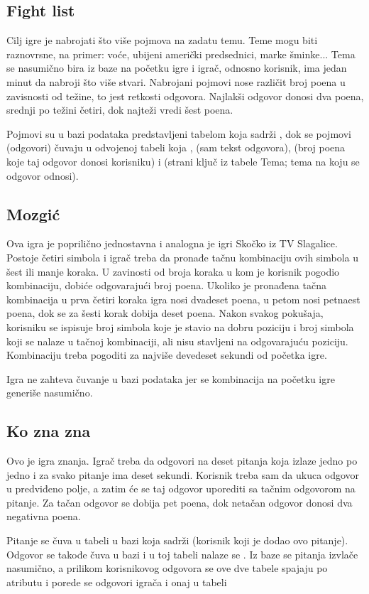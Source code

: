 \documentclass{article}
\begin{document}
\subsection{Fight list}
Cilj igre je nabrojati što više pojmova na zadatu temu. Teme mogu biti raznovrsne, na 
primer: voće, ubijeni američki predsednici, marke šminke... Tema se nasumično bira iz baze na 
početku igre i igrač, odnosno korisnik, ima jedan minut da nabroji što više stvari. Nabrojani 
pojmovi nose različit broj poena u zavisnosti od težine, to jest retkosti odgovora. Najlakši 
odgovor donosi dva poena, srednji po težini četiri, dok najteži vredi šest poena.
\par Pojmovi su u bazi podataka predstavljeni tabelom koja sadrži , dok se 
pojmovi (odgovori) čuvaju u odvojenoj tabeli koja ,  (sam tekst odgovora), 
(broj poena koje taj odgovor donosi korisniku) i  (strani ključ iz tabele Tema; tema 
na koju se odgovor odnosi).
\subsection{Mozgić}
Ova igra je poprilično jednostavna i analogna je igri Skočko iz TV Slagalice. Postoje četiri 
simbola i igrač treba da pronađe tačnu kombinaciju ovih simbola u šest ili manje koraka. U 
zavinosti od broja koraka u kom je korisnik pogodio kombinaciju, dobiće odgovarajući broj 
poena. Ukoliko je pronađena tačna kombinacija u prva četiri koraka igra nosi dvadeset poena, u 
petom nosi petnaest poena, dok se za šesti korak dobija deset poena. Nakon svakog pokušaja, 
korisniku se ispisuje broj simbola koje je stavio na dobru poziciju i broj simbola koji se nalaze u 
tačnoj kombinaciji, ali nisu stavljeni na odgovarajuću poziciju. Kombinaciju treba pogoditi za 
najviše devedeset sekundi od početka igre.
\par Igra ne zahteva čuvanje u bazi podataka jer se kombinacija na početku igre generiše 
nasumično.
\newpage
\subsection{Ko zna zna}
Ovo je igra znanja. Igrač treba da odgovori na deset pitanja koja izlaze jedno po jedno i 
za svako pitanje ima deset sekundi. Korisnik treba sam da ukuca odgovor u predviđeno polje, a 
zatim će se taj odgovor uporediti sa tačnim odgovorom na pitanje. Za tačan odgovor se dobija 
pet poena, dok netačan odgovor donosi dva negativna poena.
\par Pitanje se čuva u tabeli u bazi koja sadrži  (korisnik koji je 
dodao ovo pitanje). Odgovor se takođe čuva u bazi i u toj tabeli nalaze se . Iz baze se pitanja izvlače nasumično, a prilikom korisnikovog odgovora se ove dve 
tabele spajaju po atributu  i porede se odgovori igrača i onaj u tabeli
\newpage
\end{document}
